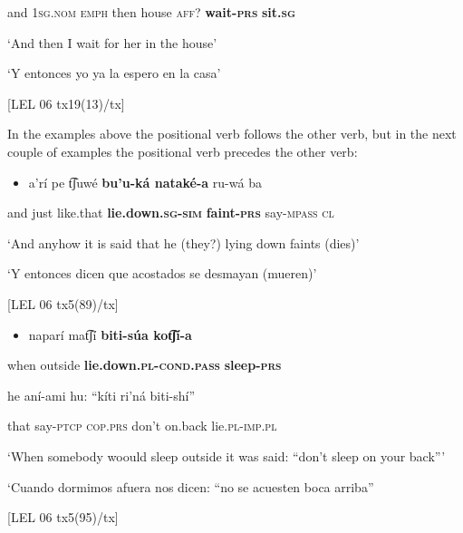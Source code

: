   and   1\textsc{sg.nom   emph} then   house    \textsc{aff?} \textbf{wait-\textsc{prs} }\textbf{sit.\textsc{sg}}

  ‘And then I wait for her in the house’

  ‘Y entonces yo ya la espero en la casa’

  [LEL 06 tx19(13)/tx]

  In the examples above the positional verb follows the other verb, but in the next couple of examples the positional verb precedes the other verb:

\begin{itemize}
\item a’rí   pe   t͡ʃuwé     \textbf{bu’u-ká     nataké-a}    ru-wá     ba
\end{itemize}

  and  just  like.that      \textbf{lie.down\textsc{.sg-sim} }\textbf{faint-\textsc{prs}} say-\textsc{mpass   cl}  

  ‘And anyhow it is said that he (they?) lying down faints (dies)’

‘Y entonces dicen que acostados se desmayan (mueren)’

[LEL 06 tx5(89)/tx]  

\begin{itemize}
\item naparí   mat͡ʃí     \textbf{biti-súa       kot͡ʃí-a}     
\end{itemize}

when  outside    \textbf{lie.down\textsc{.pl}}\textbf{{}-}\textbf{\textsc{cond.pass} }\textbf{sleep-\textsc{prs}} 

he   aní-ami   hu:    “kíti   ri’ná     biti-shí”

that   say-\textsc{ptcp   cop.prs} don’t   on.back   lie.\textsc{pl}{}-\textsc{imp.pl}    

  ‘When somebody woould sleep outside it was said: “don’t sleep on your back”’

‘Cuando dormimos afuera nos dicen: “no se acuesten boca arriba”

  [LEL 06 tx5(95)/tx]
